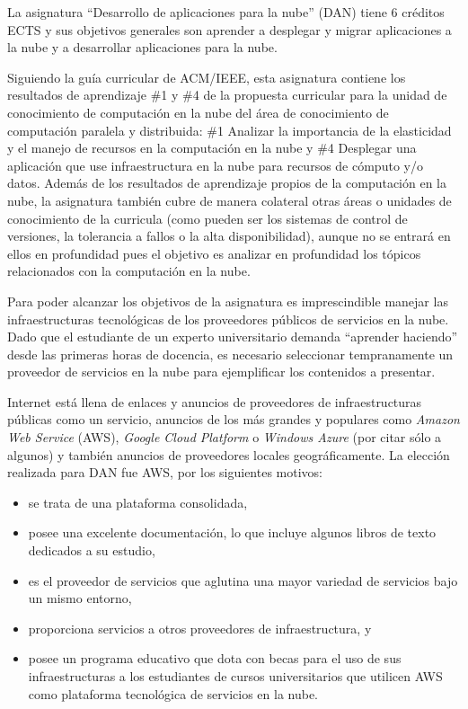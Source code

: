 \documentclass[conference]{IEEEtran}
\begin{document}
La asignatura ``Desarrollo de aplicaciones para la nube'' (DAN) tiene 6 créditos
ECTS y sus objetivos generales son aprender a desplegar y migrar aplicaciones a la
nube y a desarrollar aplicaciones para la nube.

Siguiendo la guía curricular de ACM/IEEE, esta asignatura contiene los resultados de aprendizaje 
\#1 y \#4 de la propuesta curricular para la unidad de conocimiento de computación en la nube del 
área de conocimiento de computación paralela y distribuida: \#1 Analizar la importancia de la 
elasticidad y el manejo de recursos en la computación en la nube y \#4 Desplegar una aplicación que 
use infraestructura en la nube para recursos de cómputo y/o datos. Además de los resultados de 
aprendizaje propios de la computación en la nube, la asignatura también cubre de manera colateral 
otras áreas o unidades de conocimiento de la curricula (como pueden ser los sistemas de control de 
versiones, la tolerancia a fallos o la alta disponibilidad), aunque no se entrará en ellos en 
profundidad pues el objetivo es analizar en profundidad los tópicos relacionados con la computación 
en la nube.


Para poder alcanzar los objetivos de la asignatura es imprescindible  manejar las infraestructuras 
tecnológicas de los proveedores públicos de servicios en la nube. Dado que el estudiante de un
experto universitario demanda ``aprender haciendo'' desde las primeras horas de docencia, es necesario 
seleccionar tempranamente un proveedor de servicios en la nube para ejemplificar los contenidos a
presentar.

Internet está llena de enlaces y anuncios de proveedores de infraestructuras públicas
como un servicio, anuncios de los más grandes y populares como \textit{Amazon
Web Service} (AWS), \textit{Google Cloud Platform} o \textit{Windows Azure} (por
citar sólo a algunos) y también anuncios de proveedores locales geográficamente.
La elección realizada para DAN fue AWS, por los siguientes motivos:
\begin{itemize}
\item se trata de una plataforma consolidada,
\item posee una excelente documentación, lo que incluye algunos libros de texto dedicados a su estudio,
\item es el proveedor de servicios que aglutina una mayor variedad de servicios bajo un mismo entorno,
\item proporciona servicios a otros proveedores de infraestructura, y
\item posee un programa educativo que dota con becas para el uso de sus infraestructuras a los estudiantes 
de cursos universitarios que utilicen AWS como plataforma tecnológica de servicios en la nube.
\end{itemize}
\end{document}
